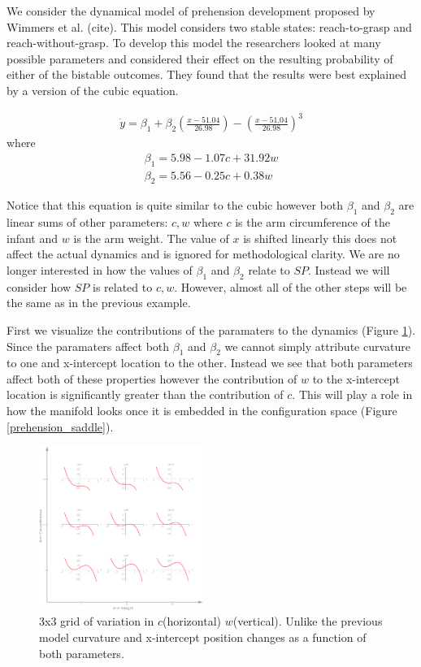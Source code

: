\documentclass[letterpaper]{article}
\begin{document}
We consider the dynamical model of prehension development proposed by 
Wimmers et al. (cite). This
model considers two stable states: reach-to-grasp and reach-without-grasp. 
To develop this
model the researchers looked at many possible parameters and considered 
their effect on 
the resulting probability of either of the bistable outcomes. 
They found that the results
were best explained by a version of the cubic equation.

\begin{eqnarray}
  \dot{y} = \beta_1 + \beta_2 (\frac{x-51.04}{26.98}) - (\frac{x-51.04}{26.98})^3
\end{eqnarray}
where
\begin{eqnarray}
  \beta_1 = 5.98 - 1.07c + 31.92w\\
  \beta_2 = 5.56 - 0.25c + 0.38w
\end{eqnarray}

Notice that this equation is quite similar to the cubic however both $\beta_1$ and 
$\beta_2$ are linear sums of other parameters: $c,w$ 
where $c$ is the arm circumference
of the infant and $w$ is the arm weight. 
The value of $x$ is shifted linearly this does 
not affect the actual dynamics and is ignored for methodological clarity. 
We are no longer
interested in how the values of $\beta_1$ and $\beta_2$ relate to $SP$. 
Instead we will
consider how $SP$ is related to $c,w$. 
However, almost all of the other steps will be the
same as in the previous example.

First we visualize the contributions of the paramaters to the dynamics 
(Figure \ref{fig5}).
Since the paramaters affect both $\beta_1$ and $\beta_2$ we cannot simply attribute 
curvature to one and x-intercept location to the other. 
Instead we see that both parameters
affect both of these properties however the contribution of 
$w$ to the x-intercept location
is significantly greater than the contribution of $c$. 
This will play a role in how the
manifold looks once it is embedded in the configuration space 
(Figure \ref{prehension_saddle}).

\begin{figure}[t]
\begin{center}
\includegraphics[width=2.1in,angle=0]{./prehension_params.png}
\caption{3x3 grid of variation in $c$(horizontal) $w$(vertical). Unlike the previous
model curvature and x-intercept position changes as a function of both parameters.}
\label{fig5}
\end{center}
\end{figure}
\end{document}
